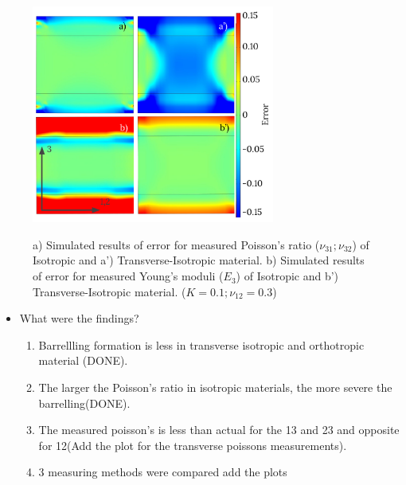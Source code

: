 \documentclass[review]{elsarticle}
\begin{document}
\begin{figure}[h]
\centering
\includegraphics[width=8cm]{BarellingError.pdf}
\label{fig:Error}
\caption{\label{fig:Error} a) Simulated results of error for measured
Poisson's ratio ($\nu_{31};\nu_{32}$) of Isotropic and a')
Transverse-Isotropic material.
b) Simulated results of error for measured Young's moduli ($E_3$)
of Isotropic and b') Transverse-Isotropic material. ($K=0.1; \nu_{12}=0.3$)}
\end{figure}





\begin{itemize}
\color{red}
\item What were the findings?

	\begin{enumerate}
	\color{black}
		\item Barrellling formation is less in transverse isotropic and orthotropic
		material (DONE).
		\item The larger the Poisson's ratio in isotropic materials, the more severe
		the barrelling(DONE).
		\item The measured poisson's is less than actual for the 13 and 23 and
		opposite for 12(Add the plot for the transverse poissons measurements).
		\item 3 measuring methods were compared {\color{red} add the plots}
		
	\end{enumerate}
\end{itemize}


\color{black}
\end{document}
